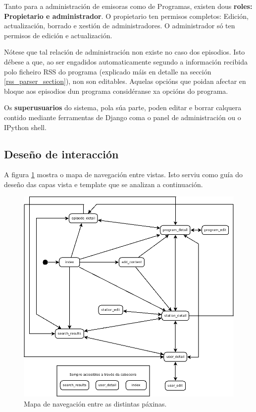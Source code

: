 Tanto para a administración de emisoras como de Programas, existen dous \textbf{roles: Propietario e administrador}. O propietario ten permisos completos: Edición, actualización, borrado e xestión de administradores. O administrador só ten permisos de edición e actualización.  

Nótese que tal relación de administración non existe no caso dos episodios. Isto débese a que, ao ser engadidos automaticamente segundo a información recibida polo ficheiro RSS do programa (explicado máis en detalle na sección \ref{rss_parser_section}), non son editables. Aquelas opcións que poidan afectar en bloque aos episodios dun programa considéranse xa opcións do programa.

Os \textbf{superusuarios} do sistema, pola súa parte, poden editar e borrar calquera contido mediante ferramentas de Django coma o panel de administración ou o IPython shell.

\subsection{Deseño de interacción}

A figura \ref{fig:access_tree} mostra o mapa de navegación entre vistas. Isto serviu como guía do deseño das capas vista e template que se analizan a continuación.

\begin{figure}[h]
	\centering
	\includegraphics[scale=0.5,keepaspectratio=true]{./images/access_tree_auth.png}
	\caption{Mapa de navegación entre as distintas páxinas.}
	\label{fig:access_tree}
\end{figure}


